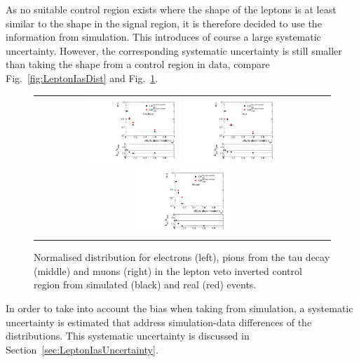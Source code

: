 As no suitable control region exists where the \ias shape of the leptons is at least similar to the shape in the signal region, it is therefore decided to use the \ias information from simulation.
This introduces of course a large systematic uncertainty.
However, the corresponding systematic uncertainty is still smaller than taking the \ias shape from a control region in data, compare Fig.~\ref{fig:LeptonIasDist} and Fig.~\ref{fig:LeptonIasDistData}.
\begin{figure}[!tb]
  \centering 
  \begin{tabular}{c}
    \includegraphics[width=0.33\textwidth]{figures/analysis/Background/hASmi_Electrons_MCCR_DataCR.pdf}
    \includegraphics[width=0.33\textwidth]{figures/analysis/Background/hASmi_Taus_MCCR_DataCR.pdf}
    \includegraphics[width=0.33\textwidth]{figures/analysis/Background/hASmi_Muons_MCCR_DataCR.pdf}
  \end{tabular}
  \caption{Normalised \ias distribution for electrons (left), pions from the tau decay (middle) and muons (right) in the lepton veto inverted control region from simulated (black) and real (red) events.}
  \label{fig:LeptonIasDistData}
\end{figure}

In order to take into account the bias when taking \ias from simulation, a systematic uncertainty is estimated that address simulation-data differences of the \ias distributions.
This systematic uncertainty is discussed in Section~\ref{sec:LeptonIasUncertainty}.
